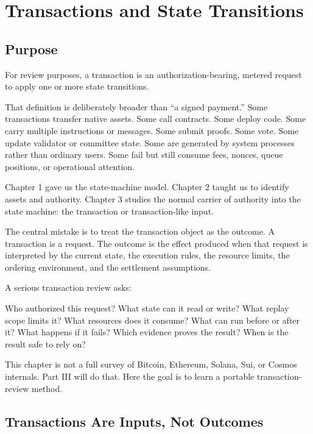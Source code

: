 \chapter{Transactions and State Transitions}

\section{Purpose}

\begin{principlebox}
For review purposes, a transaction is an authorization-bearing, metered request to apply one or more state transitions.
\end{principlebox}

That definition is deliberately broader than ``a signed payment.'' Some transactions transfer native assets. Some call contracts. Some deploy code. Some carry multiple instructions or messages. Some submit proofs. Some vote. Some update validator or committee state. Some are generated by system processes rather than ordinary users. Some fail but still consume fees, nonces, queue positions, or operational attention.

Chapter 1 gave us the state-machine model. Chapter 2 taught us to identify assets and authority. Chapter 3 studies the normal carrier of authority into the state machine: the transaction or transaction-like input.

The central mistake is to treat the transaction object as the outcome. A transaction is a request. The outcome is the effect produced when that request is interpreted by the current state, the execution rules, the resource limits, the ordering environment, and the settlement assumptions.

A serious transaction review asks:

\begin{codeblock}
Who authorized this request?
What state can it read or write?
What replay scope limits it?
What resources does it consume?
What can run before or after it?
What happens if it fails?
Which evidence proves the result?
When is the result safe to rely on?
\end{codeblock}

This chapter is not a full survey of Bitcoin, Ethereum, Solana, Sui, or Cosmos internals. Part III will do that. Here the goal is to learn a portable transaction-review method.

\section{Transactions Are Inputs, Not Outcomes}

